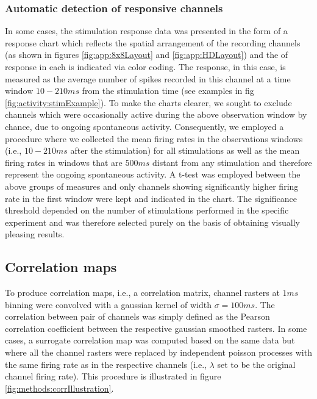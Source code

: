 \label{sec:methods:stim}


\subsubsection{Automatic detection of responsive channels}
In some cases, the stimulation response data was presented in the form of a response chart which reflects the spatial arrangement of the recording channels (as shown in figures \ref{fig:app:8x8Layout} and \ref{fig:app:HDLayout}) and the of response in each is indicated via color coding. The response, in this case, is measured as the average number of spikes recorded in this channel at a time window \(10-210ms\) from the stimulation time (see examples in fig \ref{fig:activity:stimExample}). To make the charts clearer, we sought to exclude channels which were occasionally active during the above observation window by chance, due to ongoing spontaneous activity. Consequently, we employed a procedure where we collected the mean firing rates in the observations windows (i.e., \(10-210ms\) after the stimulation) for all stimulations as well as the mean firing rates in windows that are \(500ms\) distant from any stimulation and therefore represent the ongoing spontaneous activity. A t-test was employed between the above groups of measures and only channels showing significantly higher firing rate in the first window were kept and indicated in the chart. The significance threshold depended on the number of stimulations performed in the specific experiment and was therefore selected purely on the basis of obtaining visually pleasing results.


\subsection{Correlation maps}
To produce correlation maps, i.e., a correlation matrix, channel rasters at \(1ms\) binning were convolved with a gaussian kernel of width \(\sigma=100ms\). The correlation between pair of channels was simply defined as the Pearson correlation coefficient between the respective gaussian smoothed rasters. In some cases, a surrogate correlation map was computed based on the same data but where all the channel rasters were replaced by independent poisson processes with the same firing rate as in the respective channels (i.e., \(\lambda\) set to be the original channel firing rate). This procedure is illustrated in figure \ref{fig:methods:corrIllustration}.

